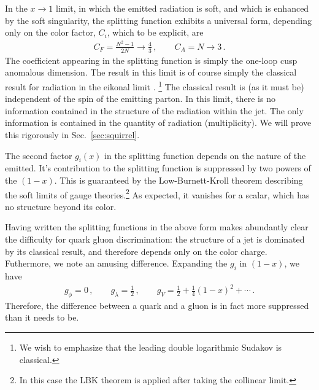 \documentclass[letterpaper,11pt]{article}
\DeclareRobustCommand{\Sec}[1]{Sec.~\ref{#1}}
\newcommand{\ijm}[1]{\marginpar{\raggedright\scriptsize\textbf{\textcolor{red}{ijm}}}  \textbf{\textcolor{red}{(#1 --ijm)}}}
\begin{document}
In the $x\to 1$ limit, in which the emitted radiation is soft, and which is enhanced by the soft singularity, the splitting function exhibits a universal form, depending only on the color factor, $C_i$, which to be explicit, are
\begin{align}
C_F=\frac{N^2-1}{2N}\to \frac{4}{3}\,, \qquad C_A=N\to 3\,.
\end{align}
The coefficient appearing in the splitting function is simply the one-loop cusp anomalous dimension. The result in this limit is of course simply the classical result for radiation in the eikonal limit \cite{Levy:1969cr}. \footnote{We wish to emphasize that the leading double logarithmic Sudakov is classical.} The classical result is (as it must be) independent of the spin of the emitting parton. In this limit, there is no information contained in the structure of the radiation within the jet. The only information is contained in the quantity of radiation (multiplicity). We will prove this rigorously in \Sec{sec:squirrel}.

The second factor $g_i(x)$ in the splitting function depends on the nature of the emitted. It's contribution to the splitting function is suppressed by two powers of the $(1-x)$. This is guaranteed by the Low-Burnett-Kroll theorem \cite{Low:1958sn,Burnett:1967km,DelDuca:1990gz} describing the soft limits of gauge theories.\footnote{In this case the LBK theorem is applied after taking the collinear limit.} As expected, it vanishes for a scalar, which has no structure beyond its color.


Having written the splitting functions in the above form makes abundantly clear the difficulty for quark gluon discrimination: the structure of a jet is dominated by its classical result, and therefore depends only on the color charge. Futhermore, we note an amusing difference. Expanding the $g_i$ in $(1-x)$, we have
\begin{align}
g_\phi=0\,, \qquad g_\lambda=\frac{1}{2}\,, \qquad g_V=\frac{1}{2}+\frac{1}{4}(1-x)^2+\cdots\,.
\end{align}
Therefore, the difference between a quark and a gluon is in fact more suppressed than it needs to be.


\end{document}
